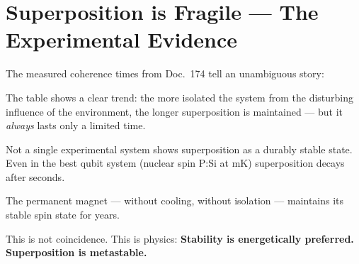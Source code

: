 \section{Superposition is Fragile --- The Experimental Evidence}
\label{sec:fragility}

The measured coherence times from Doc.~174
tell an unambiguous story:

\begin{center}
\end{center}

The table shows a clear trend:
the more isolated the system from the disturbing influence of the environment,
the longer superposition is maintained ---
but it \emph{always} lasts only a limited time.

\begin{keypoint}
Not a single experimental system shows
superposition as a durably stable state.
Even in the best qubit system (nuclear spin P:Si at mK)
superposition decays after seconds.

The permanent magnet --- without cooling, without isolation ---
maintains its stable spin state for years.

This is not coincidence. This is physics:
\textbf{Stability is energetically preferred.
Superposition is metastable.}
\end{keypoint}

